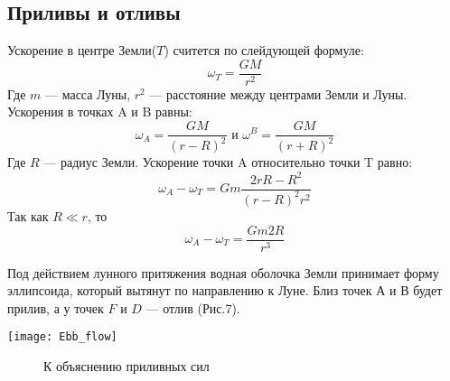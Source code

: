\subsection{Приливы и отливы}
Ускорение в центре Земли($T$) считется по слейдующей формуле: \begin{equation}\omega_T=\frac{GM}{r^2}
\end{equation}
Где $m$ --- масса Луны, $r^2$ --- расстояние между центрами Земли и Луны. Ускорения в точках A и B равны:
\begin{equation}\omega_A=\frac{GM}{(r-R)^2} \text{ и } \omega^B=\frac{GM}{(r+R)^2}
\end{equation}
Где $R$ --- радиус Земли. Ускорение точки A относительно точки T равно:
\begin{equation}\omega_A-\omega_T=Gm\frac{2rR-R^2}{(r-R)^2r^2}
\end{equation}
Так как $R\ll r$, то \begin{equation}\omega_A-\omega_T=\frac{Gm2R}{r^3}
\end{equation}

Под действием лунного притяжения водная оболочка Земли принимает форму эллипсоида, который вытянут по направлению к Луне. Близ точек $А$ и $В$ будет прилив, а у точек $F$ и $D$ --- отлив (Рис.7).
\begin{center}
\texttt{[image: Ebb\_flow]}
\begin{figure}[h!]
\caption{К объяснению приливных сил}
\end{figure}
\end{center}
